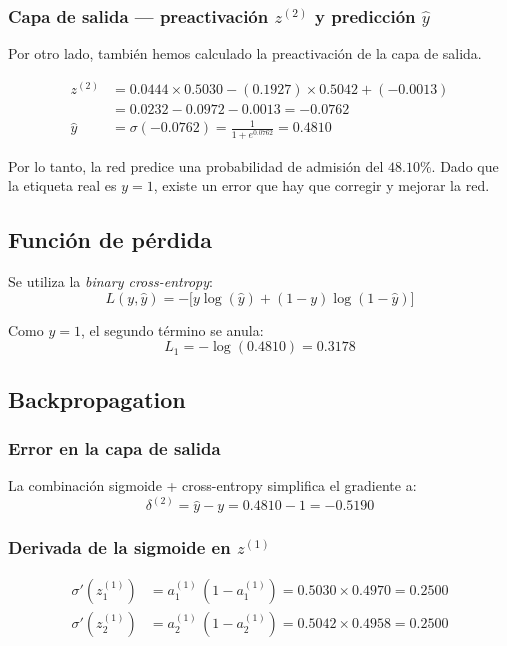 \documentclass{article}
\begin{document}
\subsubsection*{Capa de salida --- preactivación $z^{(2)}$ y predicción $\hat{y}$}
Por otro lado, también hemos calculado la preactivación de la capa de salida.

\begin{align*}
  z^{(2)} &= 0.0444 \times 0.5030 - (0.1927) \times 0.5042 + (-0.0013) \\
           &= 0.0232 - 0.0972 - 0.0013 = \mathbf{-0.0762} \\[6pt]
  \hat{y} &= \sigma(-0.0762) = \frac{1}{1+e^{0.0762}} = \mathbf{0.4810}
\end{align*}

Por lo tanto, la red predice una probabilidad de admisión del $48.10\%$. Dado que la etiqueta real es $y = 1$, existe un error que hay que corregir y mejorar la red.

\subsection*{Función de pérdida}
 
Se utiliza la \emph{binary cross-entropy}:
\[
  L(y,\hat{y}) = -\bigl[y\log(\hat{y}) + (1-y)\log(1-\hat{y})\bigr]
\]
 
Como $y = 1$, el segundo término se anula:
\[
  L_1 = -\log(0.4810) = \mathbf{0.3178}
\]

\subsection*{Backpropagation}
 
\subsubsection*{Error en la capa de salida}
 
La combinación sigmoide + cross-entropy simplifica el gradiente a:
\[
  \delta^{(2)} = \hat{y} - y = 0.4810 - 1 = \mathbf{-0.5190}
\]

\subsubsection*{Derivada de la sigmoide en $z^{(1)}$}
 
\begin{align*}
  \sigma'(z^{(1)}_1) &= a^{(1)}_1\,(1 - a^{(1)}_1) = 0.5030 \times 0.4970 = \mathbf{0.2500} \\
  \sigma'(z^{(1)}_2) &= a^{(1)}_2\,(1 - a^{(1)}_2) = 0.5042 \times 0.4958 = \mathbf{0.2500}
\end{align*}
 
\end{document}
